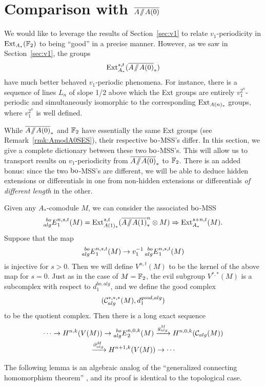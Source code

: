
\section{Comparison with $\overline{A\! \sslash \! A(0)}$}\label{sec:AA0}

We would like to leverage the results of Section~\ref{sec:v1} to relate $v_1$-periodicity in $\operatorname{Ext}_{A_*}(\mathbb{F}_2)$ to being ``good'' in a precise manner.  However, as we saw in Section~\ref{sec:v1}, the groups 
$$ \Ext^{s,t}_{A_*}(\AA0) $$
have much better behaved $v_1$-periodic phenomena. For instance, there is a sequence of lines $L_n$ of slope 1/2 above which the Ext groups are entirely $v^{2^n}_1$-periodic and simultaneously isomorphic to the corresponding $\operatorname{Ext}_{A(n)_*}$ groups, where $v_1^{2^n}$ is well defined.  




While $\AA0$ and $\mathbb{F}_2$ have essentially the same Ext groups (see Remark~\ref{rmk:AmodA0SES}), their respective $\mathrm{bo}$-MSS's differ.  In this section, we give a complete dictionary between these two $\mathrm{bo}$-MSS's.  This will allow us to transport results on $v_1$-periodicity from $\AA0$ to $\mathbb{F}_2$.  There is an added bonus: since the two $\mathrm{bo}$-MSS's are different, we will be able to deduce hidden extensions or differentials in one from non-hidden extensions or differentials \emph{of different length} in the other.

Given any $A_*$-comodule $M$, we can consider the associated $\mathrm{bo}$-MSS
$$ \prescript{bo}{alg}{E}_1^{n,s,t}(M) = \operatorname{Ext}^{s,t}_{A(1)_*}(\overline{A\! \sslash \! A(1)}^{n}_* \otimes M) \Rightarrow \operatorname{Ext}^{s+n,t}_{A_*}(M). $$
Suppose that the map 
$$ \prescript{bo}{alg}{E}_1^{n,s,t}(M) \rightarrow v_1^{-1} \prescript{bo}{alg}{E}_1^{n,s,t}(M) $$
is injective for $s > 0$.  Then we will define $V^{n,t}(M)$ to be the
kernel of the above map for $s = 0$.  Just as in the case of $M = \mathbb{F}_2$, the evil subgroup $V^{*,*}(M)$ is a subcomplex with respect to $d_1^{bo,alg}$, and we define the good complex 
$$ (\mathcal{C}_{alg}^{*,*,*}(M), d_1^{good, alg}) $$ 
to be the quotient complex.  Then there is a long exact sequence
\begin{multline}\label{eq:LESM}
 \cdots \rightarrow H^{n,k}(V(M)) \rightarrow \prescript{bo}{alg}{E}_2^{n,0,k}(M) \xrightarrow{g^M_{alg}} H^{n,0,k}(\mathcal{C}_{alg}(M)) \\ \xrightarrow{\partial^M_{alg}} H^{n+1,k}(V(M)) \rightarrow \cdots
\end{multline}

The following lemma is an algebraic analog of the ``generalized connecting homomorphism theorem'' \cite[Thm~2.3.4]{Ravenel}, and its proof is identical to the topological case.

